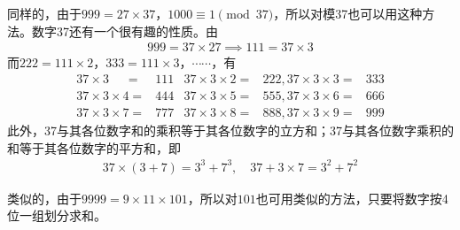 \begin{example}[数字37]
  同样的，由于$999 = 27 \times 37$，$1000\equiv1\pmod{37}$，所以对模37也可以用这种方法。数字37还有一个很有趣的性质。由
  \begin{align*}
    999 = 37\times 27 \implies 111 = 37\times 3
  \end{align*}
  而$222=111\times2$，$333=111\times 3$，$\cdots\cdots$，有
  \begin{align*}
    37 \times 3\phantom{\times9} ={}& 111 & 37\times 3\times 2 ={} & 222, 37\times 3\times 3 ={}& 333\\
    37 \times 3\times4           ={}& 444 & 37\times 3\times 5 ={} & 555, 37\times 3\times 6 ={}& 666\\
    37 \times 3\times7           ={}& 777 & 37\times 3\times 8 ={} & 888, 37\times 3\times 9 ={}& 999
  \end{align*}
  此外，37与其各位数字和的乘积等于其各位数字的立方和；37与其各位数字乘积的和等于其各位数字的平方和，即
  \begin{align*}
    37\times(3+7) = 3^3 + 7^3,\quad 37 + 3\times 7 = 3^2 + 7^2
  \end{align*}
\end{example}

\begin{example}[数字101]
  类似的，由于$9999 = 9\times 11\times 101$，所以对$101$也可用类似的方法，只要将数字按4位一组划分求和。
\end{example}



